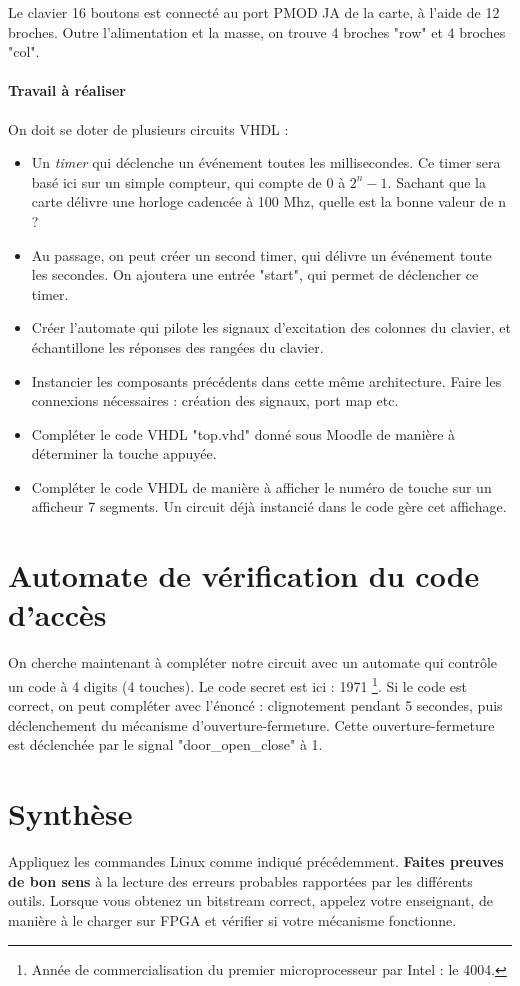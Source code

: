 \documentclass[a4paper,11pt]{article}
\begin{document}
Le clavier 16 boutons est connecté au port PMOD JA de la carte, à l'aide de 12 broches. Outre l'alimentation et la masse, on trouve 4 broches "row" et 4 broches "col".


\paragraph{Travail à réaliser}

On doit se doter de plusieurs circuits VHDL :

\begin{itemize}
  \item Un {\it timer} qui déclenche un événement toutes les millisecondes. Ce timer sera basé ici sur un simple compteur, qui compte
  de 0 à $2^n-1$. Sachant que la carte délivre une horloge cadencée à 100 Mhz, quelle est la bonne valeur de n ?
  \item Au passage, on peut créer un second timer, qui délivre un événement toute les secondes. On ajoutera une entrée "start", qui permet de déclencher ce timer.
  \item Créer l'automate qui pilote les signaux d'excitation des colonnes du clavier, et échantillone les réponses des rangées du clavier.
  \item Instancier les composants précédents dans cette même architecture. Faire les connexions nécessaires : création des signaux, port map etc.
  \item Compléter le code VHDL "top.vhd" donné sous Moodle de manière à déterminer la touche appuyée.
  \item Compléter le code VHDL de manière à afficher le numéro de touche sur un afficheur 7 segments. Un circuit déjà instancié dans le code gère cet affichage.
\end{itemize}

\section{Automate de vérification du code d'accès}

On cherche maintenant à compléter notre circuit avec un automate qui contrôle un code à 4 digits (4 touches). Le code secret est ici : 1971 \footnote{Année de commercialisation du premier microprocesseur par Intel : le 4004.}.
Si le code est correct, on peut compléter avec l'énoncé : clignotement pendant 5 secondes, puis déclenchement du mécanisme d'ouverture-fermeture. Cette ouverture-fermeture est déclenchée par le signal "door\_open\_close" à 1.

\section{Synthèse}
Appliquez les commandes Linux comme indiqué précédemment. \textbf{Faites preuves de bon sens} à la lecture des erreurs probables rapportées par les différents outils.
Lorsque vous obtenez un bitstream correct, appelez votre enseignant, de manière à le charger sur FPGA et vérifier si votre mécanisme fonctionne.

\end{document}
